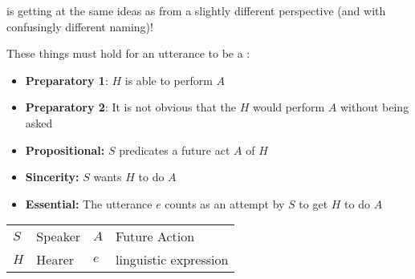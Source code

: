 \documentclass[headrule,footrule]{foils}
\begin{document}
\citet{Searle:1969} is getting at the same ideas as
\citet{Austin:1962} from a slightly different perspective (and with
confusingly different naming)! 
  



These things must hold for an utterance to be a :
\begin{itemize}
\item \textbf{Preparatory 1}: $H$ is able to perform  $A$
\item \textbf{Preparatory 2}: It is not obvious that the $H$ would perform $A$  without being asked
\item \textbf{Propositional:} $S$ predicates a future act $A$ of $H$
\item \textbf{Sincerity:}  $S$ wants $H$ to do $A$ 
\item \textbf{Essential:} The utterance $e$ counts as an attempt by $S$ to get $H$ to do $A$
\end{itemize}

  \begin{tabular}{llll}
    $S$ & Speaker & $A$ & Future Action \\
    $H$ & Hearer   & $e$ & linguistic expression  \\
  \end{tabular}
\end{document}
